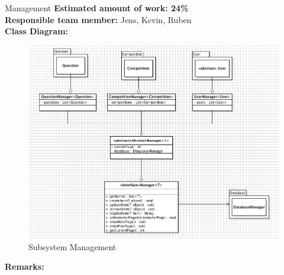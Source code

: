 \begin{subsection}{Management}
	\textbf{Estimated amount of work: 24\%} \\
	\textbf{Responsible team member:} Jens, Kevin, Ruben \\
	\textbf{Class Diagram:} \\
	
	\begin{figure}[!h]
	    \centering
			\includegraphics[width=1\textwidth]{../class_diagrams/management.png}
	    \caption{Subsystem Management}
	    \label{subsystem_management}
	\end{figure}

	\textbf{Remarks:} \\

\end{subsection}
